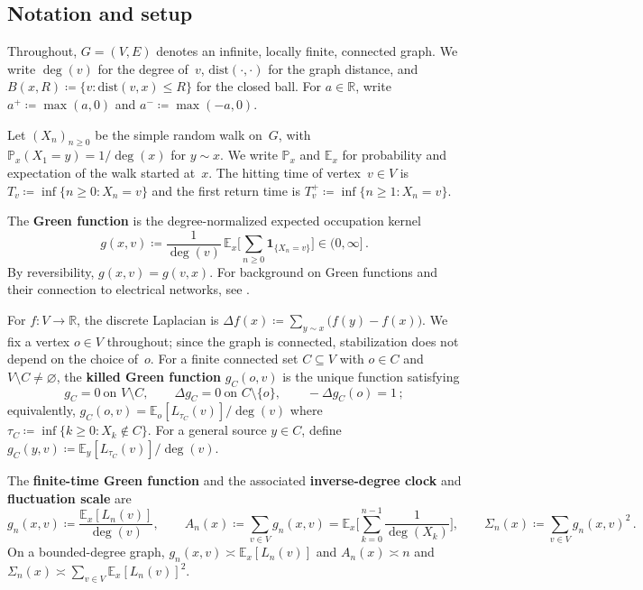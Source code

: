 \documentclass[11pt]{amsart}
\theoremstyle{plain}
\theoremstyle{definition}
\newcommand{\R}{\mathbb{R}}
\newcommand{\E}{\mathbb{E}}
\renewcommand{\P}{\mathbb{P}}
\newcommand{\one}{\mathbf{1}}
\begin{document}
	\subsection{Notation and setup}
	Throughout, $G=(V,E)$ denotes an infinite, locally finite, connected graph. We write $\deg(v)$ for the degree of~$v$, $\mathrm{dist}(\cdot,\cdot)$ for the graph distance, and $B(x,R)\coloneqq\{v:\mathrm{dist}(v,x)\leq R\}$ for the closed ball. For $a\in\R$, write $a^+\coloneqq\max(a,0)$ and $a^-\coloneqq\max(-a,0)$.
	
	Let $(X_n)_{n\geq 0}$ be the simple random walk on~$G$, with $\P_x(X_1=y)=1/\deg(x)$ for $y\sim x$. We write $\P_x$ and $\E_x$ for probability and expectation of the walk started at~$x$. The hitting time of vertex~$v \in V$ is $T_v\coloneqq\inf\{n\geq 0:X_n=v\}$ and the first return time is $T_v^+\coloneqq\inf\{n\geq 1:X_n=v\}$.
	
	The \textbf{Green function} is the degree-normalized expected occupation kernel
	\begin{equation}\label{eq:green-def}
		g(x,v)\coloneqq\frac{1}{\deg(v)}\,\E_x\biggl[\sum_{n\geq 0}\one_{\{X_n=v\}}\biggr]\in(0,\infty]\,.
	\end{equation}
	By reversibility, $g(x,v)=g(v,x)$. %
	For background on Green functions and their connection to electrical networks, see \citet[Chapter~2]{LP16}.
	
	For $f\colon V\to \R$, the discrete Laplacian is $\Delta f(x) \coloneqq \sum_{y \sim x}\bigl(f(y) - f(x)\bigr)$.
	We fix a vertex $o\in V$ throughout; since the graph is connected, stabilization does not depend on the choice of~$o$. For a finite connected set $C\subseteq V$ with $o\in C$ and $V\setminus C\neq\varnothing$, the \textbf{killed Green function} $g_C(o,v)$ is the unique function satisfying
	\begin{equation}\label{eq:gC-PDE}
		g_C=0\ \text{on }V\setminus C,\qquad \Delta g_C=0\ \text{on }C\setminus\{o\},\qquad -\Delta g_C(o)=1\,;
	\end{equation}
	equivalently, $g_C(o,v)=\E_o[L_{\tau_C}(v)]/\deg(v)$ where $\tau_C\coloneqq\inf\{k\geq 0:X_k\notin C\}$. For a general source $y\in C$, define $g_C(y,v)\coloneqq\E_y[L_{\tau_C}(v)]/\deg(v)$.
	
	The \textbf{finite-time Green function} and the associated \textbf{inverse-degree clock} and \textbf{fluctuation scale} are
	\begin{equation}\label{eq:gn-def}
		g_n(x,v)\coloneqq\frac{\E_x[L_n(v)]}{\deg(v)},\qquad
		A_n(x)\coloneqq\sum_{v\in V}g_n(x,v)=\E_x\biggl[\sum_{k=0}^{n-1}\frac{1}{\deg(X_k)}\biggr],\qquad
		\Sigma_n(x)\coloneqq\sum_{v\in V}g_n(x,v)^2\,.
	\end{equation}
	On a bounded-degree graph, $g_n(x,v)\asymp\E_x[L_n(v)]$ and $A_n(x)\asymp n$ and $\Sigma_n(x)\asymp\sum_{v\in V}\E_x[L_n(v)]^2$.
	
\end{document}
